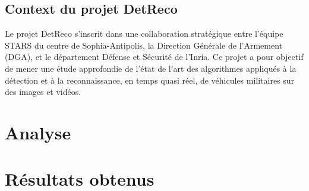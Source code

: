 \subsection{Context du projet DetReco}

Le projet DetReco s'inscrit dans une collaboration stratégique entre l'équipe STARS du centre de Sophia-Antipolis, la Direction Générale de l'Armement (DGA), et le département Défense et Sécurité de l'Inria. Ce projet a pour objectif de mener une étude approfondie de l'état de l'art des algorithmes appliqués à la détection et à la reconnaissance, en temps quasi réel, de véhicules militaires sur des images et vidéos.



\section{Analyse}

\section{Résultats obtenus}
















